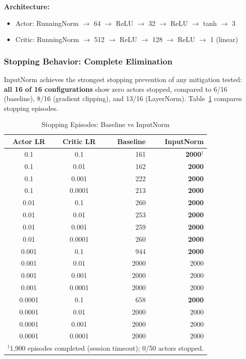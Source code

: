 \textbf{Architecture:}
\begin{itemize}
    \item Actor: RunningNorm $\rightarrow$ 64 $\rightarrow$ ReLU $\rightarrow$ 32 $\rightarrow$ ReLU $\rightarrow$ tanh $\rightarrow$ 3
    \item Critic: RunningNorm $\rightarrow$ 512 $\rightarrow$ ReLU $\rightarrow$ 128 $\rightarrow$ ReLU $\rightarrow$ 1 (linear)
\end{itemize}

\subsubsection{Stopping Behavior: Complete Elimination}

InputNorm achieves the strongest stopping prevention of any mitigation tested: \textbf{all 16 of 16 configurations} show zero actors stopped, compared to 6/16 (baseline), 8/16 (gradient clipping), and 13/16 (LayerNorm). Table~\ref{tab:inputnorm_stopping} compares stopping episodes.

\begin{table}[htbp]
\caption{Stopping Episodes: Baseline vs InputNorm}
\label{tab:inputnorm_stopping}
\centering
\small
\begin{tabular}{ccrr}
\toprule
\textbf{Actor LR} & \textbf{Critic LR} & \textbf{Baseline} & \textbf{InputNorm} \\
\midrule
0.1 & 0.1 & 161 & \textbf{2000}$^\dagger$ \\
0.1 & 0.01 & 162 & \textbf{2000} \\
0.1 & 0.001 & 222 & \textbf{2000} \\
0.1 & 0.0001 & 213 & \textbf{2000} \\
0.01 & 0.1 & 260 & \textbf{2000} \\
0.01 & 0.01 & 253 & \textbf{2000} \\
0.01 & 0.001 & 259 & \textbf{2000} \\
0.01 & 0.0001 & 260 & \textbf{2000} \\
0.001 & 0.1 & 944 & \textbf{2000} \\
0.001 & 0.01 & 2000 & 2000 \\
0.001 & 0.001 & 2000 & 2000 \\
0.001 & 0.0001 & 2000 & 2000 \\
0.0001 & 0.1 & 658 & \textbf{2000} \\
0.0001 & 0.01 & 2000 & 2000 \\
0.0001 & 0.001 & 2000 & 2000 \\
0.0001 & 0.0001 & 2000 & 2000 \\
\bottomrule
\multicolumn{4}{l}{\footnotesize $^\dagger$1,900 episodes completed (session timeout); 0/50 actors stopped.}
\end{tabular}
\end{table}

